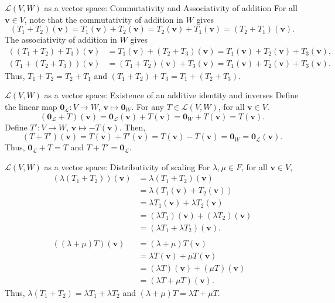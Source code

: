 \documentclass{beamer}
\def\v{\bm{v}}
\def\L{\mathcal{L}}
\begin{document}
        \begin{frame}{$\L(V, W)$ as a vector space: Commutativity and Associativity of addition}
                For all $\v\in V$, note that the commutativity of addition in $W$ gives
                \[
                        (T_1 + T_2)(\v) = T_1(\v) + T_2(\v) = T_2(\v) + T_1(\v) = (T_2 + T_1)(\v).
                \]
                The associativity of addition in $W$ gives
                \begin{align*}
                        ((T_1 + T_2) + T_3)(\v) &= T_1(\v) + (T_2 + T_3)(\v) = T_1(\v) + T_2(\v) + T_3(\v), \\
                        (T_1 + (T_2 + T_3))(\v) &= (T_1 + T_2)(\v) + T_3(\v) = T_1(\v) + T_2(\v) + T_3(\v).
                \end{align*}
                Thus, $T_1 + T_2 = T_2 + T_1$ and $(T_1 + T_2) + T_3 = T_1 + (T_2 + T_3)$.
        \end{frame}

        \begin{frame}{$\L(V, W)$ as a vector space: Existence of an additive identity and inverses}
                Define the linear map $\mathbf{0}_\L\colon V \to W$, $\v \mapsto \mathbf{0}_W$. For any $T \in \L(V, W)$, for all $\v \in V$.
                \[
                        (\mathbf{0}_\L + T)(\v) = \mathbf{0}_\L(\v) + T(\v) = \mathbf{0}_W + T(\v) = T(\v).
                \]
                Define $T'\colon V \to W$, $\v \mapsto -T(\v)$. Then,
                \[
                        (T + T')(\v) = T(\v) + T'(\v) = T(\v) - T(\v) = \mathbf{0}_W = \mathbf{0}_\L(\v).
                \]
                Thus, $\mathbf{0}_\L + T = T$ and $T + T' = \mathbf{0}_\L$.
        \end{frame}
        
        \begin{frame}{$\L(V, W)$ as a vector space: Distributivity of scaling}
                For $\lambda, \mu \in F$, for all $\v \in V$,
                \begin{align*}
                        (\lambda (T_1 + T_2))(\v) &= \lambda (T_1 + T_2)(\v) \\
                                &= \lambda(T_1(\v) + T_2(\v)) \\
                                &= \lambda T_1(\v) + \lambda T_2(\v) \\
                                &= (\lambda T_1)(\v) + (\lambda T_2)(\v) \\
                                &= (\lambda T_1 + \lambda T_2)(\v). \\\\
                        ((\lambda + \mu)T)(\v) &= (\lambda + \mu)T(\v) \\
                                &= \lambda T(\v) + \mu T(\v) \\
                                &= (\lambda T)(\v) + (\mu T)(\v) \\
                                &= (\lambda T + \mu T)(\v).
                \end{align*}
                Thus, $\lambda (T_1 + T_2) = \lambda T_1 + \lambda T_2$ and $(\lambda + \mu)T = \lambda T + \mu T$.
        \end{frame}
        
\end{document}
